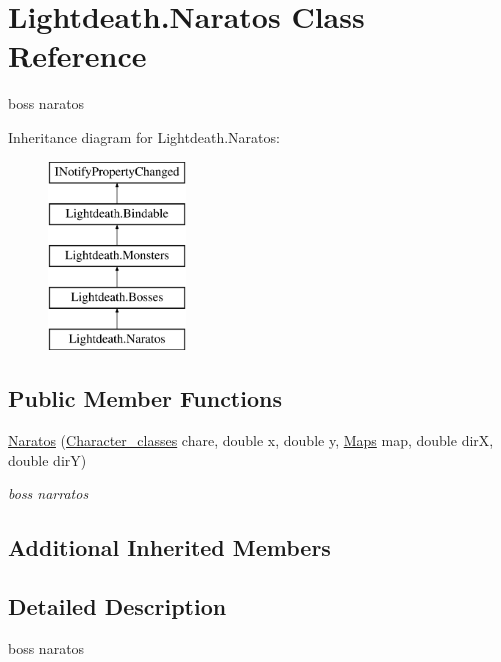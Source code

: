 \hypertarget{class_lightdeath_1_1_naratos}{}\section{Lightdeath.\+Naratos Class Reference}
\label{class_lightdeath_1_1_naratos}


boss naratos  


Inheritance diagram for Lightdeath.\+Naratos\+:\begin{figure}[H]
\begin{center}
\leavevmode
\includegraphics[height=5.000000cm]{class_lightdeath_1_1_naratos}
\end{center}
\end{figure}
\subsection*{Public Member Functions}
\begin{DoxyCompactItemize}
\item 
\hyperlink{class_lightdeath_1_1_naratos_a536f8f991292832d69b62938a9b6a45b}{Naratos} (\hyperlink{class_lightdeath_1_1_character__classes}{Character\+\_\+classes} chare, double x, double y, \hyperlink{class_lightdeath_1_1_maps}{Maps} map, double dirX, double dirY)
\begin{DoxyCompactList}\small\item\em boss narratos \end{DoxyCompactList}\end{DoxyCompactItemize}
\subsection*{Additional Inherited Members}


\subsection{Detailed Description}
boss naratos 




